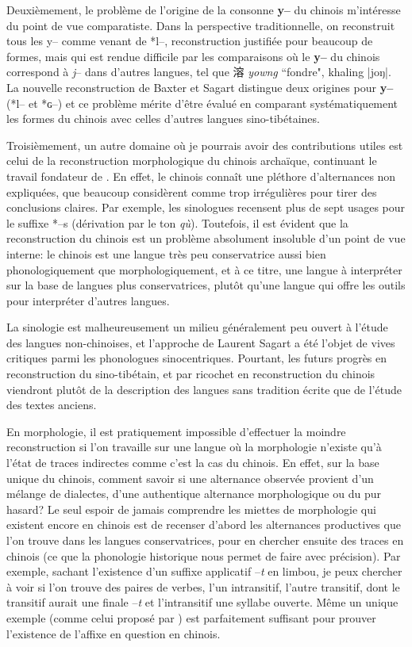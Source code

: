 \documentclass[oldfontcommands,oneside,a4paper,11pt]{memoir}
\newcommand{\ipa}[1]{{\phon\textbf{#1}}}
\newcommand{\zh}[1]{{\cn #1}}
\begin{document}
Deuxièmement, le problème de l'origine de la consonne \ipa{y--} du chinois m'intéresse du point de vue comparatiste. Dans la perspective traditionnelle, on reconstruit tous les y-- comme venant de *l--, reconstruction justifiée pour beaucoup de formes, mais qui est rendue difficile par les comparaisons où le \ipa{y--} du chinois correspond  à \textit{j}-- dans d'autres langues, tel que \zh{溶} \textit{yowng} ``fondre", khaling |joŋ|.  La nouvelle reconstruction de Baxter et Sagart distingue deux origines pour \ipa{y--} (*l-- et *ɢ--) et ce problème mérite d'être évalué en comparant systématiquement les formes du chinois avec celles d'autres langues sino-tibétaines.


Troisièmement, un autre domaine où je pourrais avoir des contributions utiles est celui de la reconstruction morphologique du chinois archaïque, continuant le travail fondateur de \citet{sagart99roc}. En effet, le chinois connaît une pléthore d'alternances non expliquées, que beaucoup   considèrent   comme trop irrégulières pour tirer des conclusions claires. Par exemple, les sinologues recensent plus de sept usages pour le suffixe *--s (dérivation par le ton \textit{qù}). Toutefois, il est évident que la reconstruction du chinois est un problème absolument insoluble d'un point de vue interne: le chinois est une langue très peu conservatrice aussi bien phonologiquement que morphologiquement, et à ce titre, une langue à interpréter sur la base de langues plus conservatrices, plutôt qu'une langue qui offre les outils pour interpréter d'autres langues. 

La sinologie est malheureusement un milieu généralement peu ouvert à l'étude des langues non-chinoises, et l'approche de Laurent Sagart a été l'objet de vives critiques parmi les phonologues sinocentriques.   Pourtant, les futurs  progrès en reconstruction du sino-tibétain, et par ricochet en reconstruction du chinois viendront plutôt de la description des langues sans tradition écrite que de l'étude des textes anciens. 
 


En morphologie, il est pratiquement impossible d'effectuer la moindre reconstruction si l'on travaille sur une langue où la morphologie n'existe qu'à l'état de traces indirectes comme c'est la cas du chinois. En effet, sur la base unique du chinois, comment savoir si une alternance observée provient d'un mélange de dialectes, d'une authentique alternance morphologique ou du pur hasard? Le seul espoir de jamais comprendre les miettes de morphologie qui existent encore en chinois est de recenser d'abord les alternances productives que l'on trouve dans les langues  conservatrices, pour  en chercher ensuite des traces en chinois (ce que la phonologie historique nous permet de faire avec précision). Par exemple, sachant l'existence d'un suffixe applicatif --\textit{t} en limbou, je peux chercher à voir si l'on trouve des paires de verbes, l'un intransitif, l'autre transitif, dont le transitif aurait une finale --\textit{t} et l'intransitif une syllabe ouverte. Même un unique exemple (comme celui proposé par \citet{sagart04directions}) est parfaitement suffisant pour prouver l'existence de l'affixe en question en chinois. 
\end{document}
